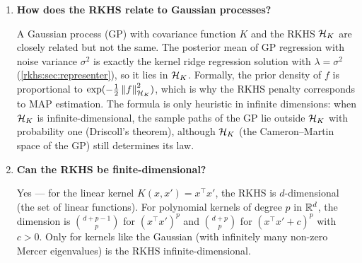 \begin{notechapter}
\begin{enumerate}[label=\emph{Q\arabic*.}, leftmargin=*, itemsep=10pt]
\item \textbf{How does the RKHS relate to Gaussian processes?}

A Gaussian process (GP) with covariance function $K$ and the RKHS $\mathcal{H}_K$ are closely related but not the same. The posterior mean of GP regression with noise variance $\sigma^2$ is exactly the kernel ridge regression solution with $\lambda = \sigma^2$ (\cref{rkhs:sec:representer}), so it lies in $\mathcal{H}_K$. Formally, the prior density of $f$ is proportional to $\exp(-\frac12\left\|f\right\|_{\mathcal{H}_K}^2)$, which is why the RKHS penalty corresponds to MAP estimation. The formula is only heuristic in infinite dimensions: when $\mathcal{H}_K$ is infinite-dimensional, the sample paths of the GP lie outside $\mathcal{H}_K$ with probability one (Driscoll's theorem), although $\mathcal{H}_K$ (the Cameron--Martin space of the GP) still determines its law.

\item \textbf{Can the RKHS be finite-dimensional?}

Yes --- for the linear kernel $K(x,x') = x^\top x'$, the RKHS is
$d$-dimensional (the set of linear functions). For polynomial kernels of
degree $p$ in $\mathbb{R}^d$, the dimension is $\binom{d+p-1}{p}$ for $(x^\top x')^p$ and $\binom{d+p}{p}$ for $(x^\top x' + c)^p$ with $c > 0$. Only for
kernels like the Gaussian (with infinitely many non-zero Mercer
eigenvalues) is the RKHS infinite-dimensional.

\end{enumerate}


\end{notechapter}
